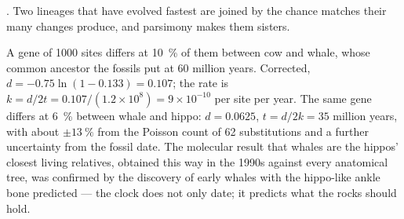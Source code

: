 \begin{omfigure}

{\small {}. Two lineages that have evolved
fastest are joined by the chance matches their many changes
produce, and parsimony makes them sisters.}
\end{omfigure}

\begin{example}\label{ex:b2:phylogenetic-trees:dating}
A gene of \num{1000} sites differs at \qty{10}{\%} of them between
cow and whale, whose common ancestor the fossils put at 60 million
years. Corrected, $d = -0.75\ln(1 - 0.133) = 0.107$; the rate is $k
= d/2t = 0.107/(1.2\times 10^{8}) = 9\times 10^{-10}$ per site per
year. The same gene differs at \qty{6}{\%} between whale and hippo:
$d = 0.0625$, $t = d/2k = 35$ million years, with about $\pm
\qty{13}{\%}$ from the Poisson count of 62 substitutions and a
further uncertainty from the fossil date. The molecular result
that whales are the hippos' closest living relatives, obtained this
way in the 1990s against every anatomical tree, was confirmed by
the discovery of early whales with the hippo-like ankle bone
predicted --- the clock does not only date; it predicts what the
rocks should hold.
\end{example}

